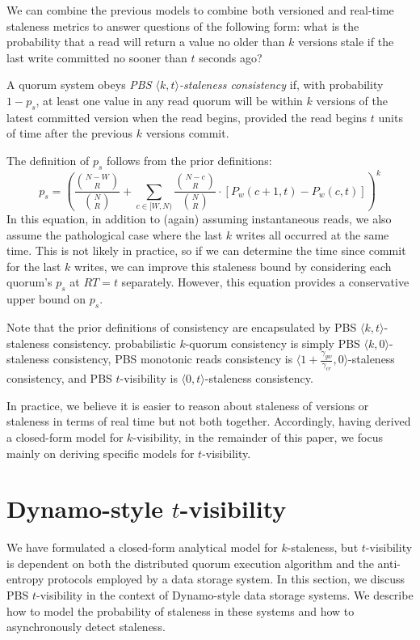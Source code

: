 \documentclass{vldb}
\begin{document}
We can combine the previous models to combine both versioned and
real-time staleness metrics to answer questions of the following form:
what is the probability that a read will return a value no older than
$k$ versions stale if the last write committed no sooner than $t$ seconds
ago?
\begin{definition}
A quorum system obeys \textit{PBS $\langle k, t \rangle$-staleness
  consistency} if, with probability $1-p_{s}$, at least one value in
any read quorum will be within $k$ versions of the latest committed
version when the read begins, provided the read begins $t$ units of
time after the previous $k$ versions commit.
\end{definition}
The definition of $p_{s}$ follows from the prior definitions:
\begin{equation}
p_{s} = \left(\frac{{N-W \choose R}}{{N \choose R}}+\sum_{c\in[W, N)} \frac{{N-c \choose R}}{{N \choose R}} \cdot [P_w(c+1, t)-P_w(c,t)]\right)^k
\end{equation}
In this equation, in addition to (again) assuming instantaneous reads,
we also assume the pathological case where the last $k$ writes all
occurred at the same time.  This is not likely in practice, so if we
can determine the time since commit for the last $k$ writes, we can
improve this staleness bound by considering each quorum's $p_{s}$
at $RT=t$ separately.  However, this equation provides a conservative
upper bound on $p_{s}$.

Note that the prior definitions of consistency are encapsulated by PBS
$\langle k, t \rangle$-staleness consistency. probabilistic $k$-quorum
consistency is simply PBS $\langle k, 0 \rangle$-staleness consistency,
PBS monotonic reads consistency is $\langle
1+\frac{\gamma_{gw}}{\gamma_{cr}}, 0 \rangle$-staleness consistency, and
PBS $t$-visibility is $\langle 0, t \rangle$-staleness consistency.

In practice, we believe it is easier to reason about staleness of
versions or staleness in terms of real time but not both together.
Accordingly, having derived a closed-form model for $k$-visibility, in
the remainder of this paper, we focus mainly on deriving specific models
for $t$-visibility.

\section{Dynamo-style $t$-visibility}
\label{sec:dynamo}

We have formulated a closed-form analytical model for $k$-staleness,
but $t$-visibility is dependent on both the distributed quorum
execution algorithm and the anti-entropy protocols employed by a data
storage system.  In this section, we discuss PBS $t$-visibility in the
context of Dynamo-style data storage systems.  We describe how to
model the probability of staleness in these systems and how to
asynchronously detect staleness.
\end{document}
